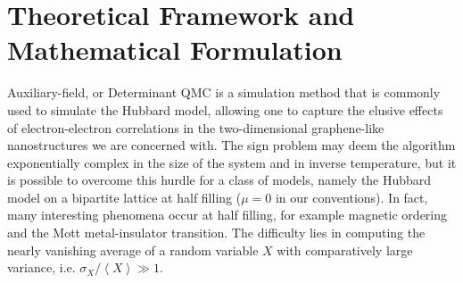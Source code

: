 \section{Theoretical Framework and Mathematical Formulation}
\label{sec:matform}

Auxiliary-field, or Determinant \acs{QMC} is a simulation method that is commonly used to simulate the Hubbard model, allowing one to capture the elusive effects of electron-electron correlations in the two-dimensional graphene-like nanostructures we are concerned with.
The sign problem may deem the algorithm exponentially complex in the size of the system and in inverse temperature, but it is possible to overcome this hurdle for a class of models, namely the Hubbard model on a bipartite lattice at half filling ($\mu = 0$ in our conventions).
In fact, many interesting phenomena occur at half filling, for example magnetic ordering and the Mott metal-insulator transition.
The difficulty lies in computing the nearly vanishing average of a random variable $X$ with comparatively large variance, i.e. $\sigma_X / \left\langle X \right\rangle \gg 1$.

